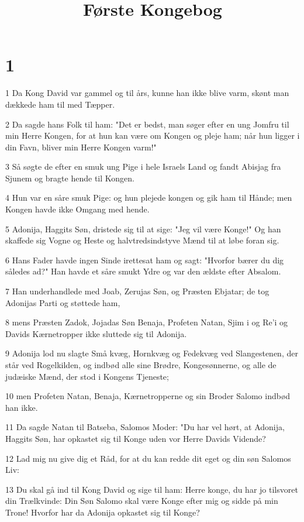 

\title{Første Kongebog}


\chapter{1}

\par 1 Da Kong David var gammel og til års, kunne han ikke blive varm, skønt man dækkede ham til med Tæpper.
\par 2 Da sagde hans Folk til ham: "Det er bedst, man søger efter en ung Jomfru til min Herre Kongen, for at hun kan være om Kongen og pleje ham; når hun ligger i din Favn, bliver min Herre Kongen varm!"
\par 3 Så søgte de efter en smuk ung Pige i hele Israels Land og fandt Abisjag fra Sjunem og bragte hende til Kongen.
\par 4 Hun var en såre smuk Pige: og hun plejede kongen og gik ham til Hånde; men Kongen havde ikke Omgang med hende.
\par 5 Adonija, Haggits Søn, dristede sig til at sige: "Jeg vil være Konge!" Og han skaffede sig Vogne og Heste og halvtredsindstyve Mænd til at løbe foran sig.
\par 6 Hans Fader havde ingen Sinde irettesat ham og sagt: "Hvorfor bærer du dig således ad?" Han havde et såre smukt Ydre og var den ældste efter Absalom.
\par 7 Han underhandlede med Joab, Zerujas Søn, og Præsten Ebjatar; de tog Adonijas Parti og støttede ham,
\par 8 mens Præsten Zadok, Jojadas Søn Benaja, Profeten Natan, Sjim i og Re'i og Davids Kærnetropper ikke sluttede sig til Adonija.
\par 9 Adonija lod nu slagte Små kvæg, Hornkvæg og Fedekvæg ved Slangestenen, der står ved Rogelkilden, og indbød alle sine Brødre, Kongesønnerne, og alle de judæiske Mænd, der stod i Kongens Tjeneste;
\par 10 men Profeten Natan, Benaja, Kærnetropperne og sin Broder Salomo indbød han ikke.
\par 11 Da sagde Natan til Batseba, Salomos Moder: "Du har vel hørt, at Adonija, Haggits Søn, har opkastet sig til Konge uden vor Herre Davids Vidende?
\par 12 Lad mig nu give dig et Råd, for at du kan redde dit eget og din søn Salomos Liv:
\par 13 Du skal gå ind til Kong David og sige til ham: Herre konge, du har jo tilsvoret din Trælkvinde: Din Søn Salomo skal være Konge efter mig og sidde på min Trone! Hvorfor har da Adonija opkastet sig til Konge?
